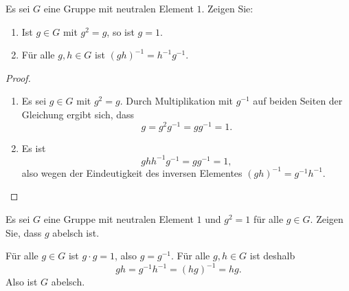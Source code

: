 

\begin{question}
 Es sei $G$ eine Gruppe mit neutralen Element $1$. Zeigen Sie:
 \begin{enumerate}
  \item
   Ist $g \in G$ mit $g^2 = g$, so ist $g = 1$.
  \item
   Für alle $g,h \in G$ ist $(gh)^{-1} = h^{-1} g^{-1}$.
 \end{enumerate}
\end{question}
\begin{proof}
 \begin{enumerate}
  \item
   Es sei $g \in G$ mit $g^2 = g$. Durch Multiplikation mit $g^{-1}$ auf beiden Seiten der Gleichung ergibt sich, dass
   \[
    g = g^2 g^{-1} = g g^{-1} = 1.
   \]
  \item
   Es ist
   \[
    gh h^{-1} g^{-1} = g g^{-1} = 1,
   \]
   also wegen der Eindeutigkeit des inversen Elementes $(gh)^{-1} = g^{-1} h^{-1}$.
  \qedhere
 \end{enumerate}
\end{proof}



\begin{question}
 Es sei $G$ eine Gruppe mit neutralen Element $1$ und $g^2 = 1$ für alle $g \in G$. Zeigen Sie, dass $g$ abelsch ist.
\end{question}
\begin{solution}
 Für alle $g \in G$ ist $g \cdot g = 1$, also $g = g^{-1}$. Für alle $g,h \in G$ ist deshalb
 \[
  gh = g^{-1} h^{-1} = (hg)^{-1} = hg.
 \]
 Also ist $G$ abelsch.
\end{solution}



